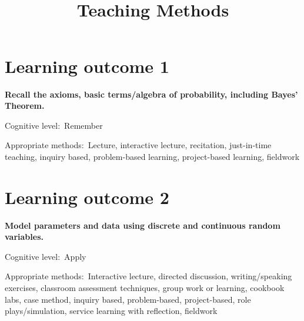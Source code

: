 \documentclass[11pt,onecolumn]{article}
\title{\textbf{\coursename} \\Teaching Methods}
\date{}
\makeatletter
\newcommand{\myname}{A.~Grant Schissler}
\newcommand{\myemail}{aschissler@unr.edu}
\newcommand{\office}{DMSC 224}
\newcommand{\officehours}{Tue 2:30pm-3:30pm, Wed 1:30pm-2:30pm, or by appointment}
\makeatother
\begin{document}
\maketitle

\vspace{-0.75in}
\noindent\makebox[\linewidth]{\rule{\textwidth}{1pt}}


\section{Learning outcome 1}
\textbf{Recall the axioms, basic terms/algebra of probability, including Bayes' Theorem.}

Cognitive level:~Remember

Appropriate methods:~Lecture, interactive lecture, recitation, just-in-time teaching, inquiry based\footnotemark, problem-based learning\footnotemark[\value{footnote}], project-based learning\footnotemark[\value{footnote}], fieldwork


\section{Learning outcome 2}
\textbf{Model parameters and data using discrete and continuous random variables.}

Cognitive level:~Apply

Appropriate methods:~Interactive lecture\footnotemark, directed discussion\footnotemark[\value{footnote}], writing/speaking exercises, classroom assessment techniques, group work or learning\footnotemark[\value{footnote}], cookbook labs, case method, inquiry based, problem-based, project-based, role plays/simulation, service learning with reflection, fieldwork

\end{document}
